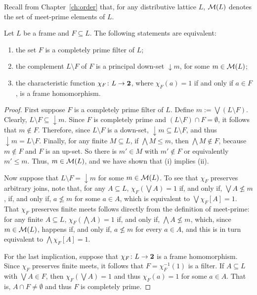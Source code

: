 Recall from Chapter~\ref{ch:order} that, for any distributive lattice $L$, $\mathcal{M}(L)$ denotes the set of meet-prime elements of $L$.

\begin{proposition}\label{prop:frame-points}
Let $L$ be a frame and $F\subseteq L$. The following statements are equivalent:
\begin{enumerate}[label=(\roman*)]
\item the set $F$ is a completely prime filter of $L$;
\item the complement $L\setminus F$ of $F$ is a principal down-set ${\downarrow}m$, for some $m \in \mathcal{M}(L)$;
\item the characteristic function $\chi_F\colon L\to {\bf 2}$, where $\chi_F(a)=1$ if and only if $a\in F$, is a frame homomorphism.
\end{enumerate}
\end{proposition}

\begin{proof}
First suppose $F$ is a completely prime filter of $L$. Define $m:=\bigvee (L\setminus F)$. Clearly, $L\setminus F\subseteq{\downarrow}m$. Since $F$ is completely prime and $(L\setminus F)\cap F=\emptyset$, it follows that $m\not\in F$. Therefore, since $L\setminus F$ is a down-set, $
{\downarrow}m\subseteq L\setminus F$, 
and thus ${\downarrow}m=L\setminus F$. Finally, for any finite $M\subseteq L$, if  $\bigwedge M\leq m$, then $\bigwedge M\not\in F$, because $m \not\in F$ and $F$ is an up-set. So there is $m'\in M$ with $m'\not\in F$ or equivalently $m'\leq m$. Thus, $m \in \mathcal{M}(L)$, and we have shown that (i) implies (ii).

Now suppose that $L\setminus F={\downarrow}m$ for some $m \in \mathcal{M}(L)$. To see that $\chi_F$ preserves arbitrary joins, note that, for any $A \subseteq L$, $\chi_F(\bigvee A) = 1$ if, and only if, $\bigvee A \nleq m$, if, and only if, $a \nleq m$ for some $a \in A$, which is equivalent to $\bigvee \chi_F[A] = 1$. %
That $\chi_F$ preserves finite meets follows directly from the definition of meet-prime: for any finite $A \subseteq L$, $\chi_F(\bigwedge A) = 1$ if, and only if, $\bigwedge A \nleq m$, which, since $m \in \mathcal{M}(L)$, happens if, and only if, $a \nleq m$ for every $a \in A$, and this is in turn equivalent to $\bigwedge \chi_F[A] = 1$.

For the last implication, suppose that $\chi_F\colon L\to {\bf 2}$ is a frame homomorphism. Since $\chi_F$ preserves finite meets, it follows that $F=\chi_F^{-1}(1)$ is a filter. If $A\subseteq L$ with $\bigvee A\in F$, then $\chi_F(\bigvee A)=1$ and thus $\chi_F(a)=1$ for some $a\in A$. That is, $A\cap F\neq\emptyset$ and thus $F$ is completely prime.
\end{proof}

